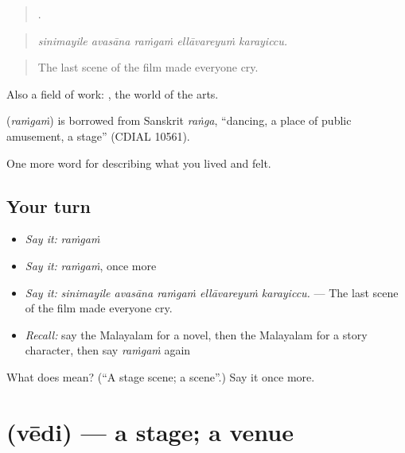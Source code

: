 \begin{quote}
    .
\end{quote}

\begin{quote}
\emph{sinimayile avasāna raṁgaṁ ellāvareyuṁ karayiccu.}
\end{quote}

\begin{quote}
The last scene of the film made everyone cry.
\end{quote}

Also a field of work: , the world of the arts.

\begin{cousinweb}
\textbf{} (\emph{raṁgaṁ}) is borrowed from Sanskrit \emph{raṅga}, \textquotedblleft{}dancing, a place of public amusement, a stage\textquotedblright{} (CDIAL 10561).
\end{cousinweb}

\begin{grammarlens}[title={What you've built}]
One more word for describing what you lived and felt.
\end{grammarlens}

\subsection*{Your turn}
\begin{itemize}
\raggedright
  \item \emph{Say it:} \emph{raṁgaṁ}
  \item \emph{Say it:} \emph{raṁgaṁ}, once more
  \item \emph{Say it:} \emph{sinimayile avasāna raṁgaṁ ellāvareyuṁ karayiccu.} — The last scene of the film made everyone cry.
  \item \emph{Recall:} say the Malayalam for a novel, then the Malayalam for a story character, then say \emph{raṁgaṁ} again
\end{itemize}

\begin{tcolorbox}[breakable,colback=teal!4,colframe=teal!35!black,title={Before you move on}]
What does  mean? (\textquotedblleft{}A stage scene; a scene\textquotedblright{}.) Say it once more.
\end{tcolorbox}
\section[\texorpdfstring{\ml{വേദി} (vēdi)}{വേദി (vēdi)}]{ (vēdi) — a stage; a venue}

